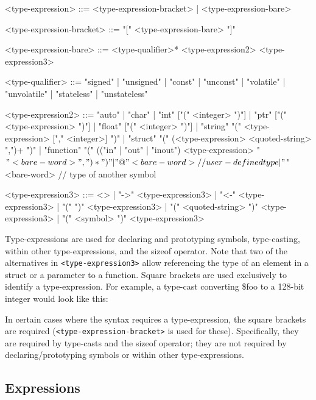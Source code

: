 \begin{sourcestyle}
\begin{verbatimtab}[\sourcetabsize]
<type-expression> ::= <type-expression-bracket>
| <type-expression-bare>

<type-expression-bracket> ::= "[" <type-expression-bare> "]"

<type-expression-bare> ::= <type-qualifier>*
  <type-expression2> <type-expression3>

<type-qualifier> ::= "signed"
| "unsigned"
| "const"
| "unconst"
| "volatile"
| "unvolatile"
| "stateless"
| "unstateless"

<type-expression2> ::= "auto"
| "char"
| "int" ["(" <integer> ")"]
| "ptr" ["(" <type-expression> ")"]
| "float" ["(" <integer> ")"]
| "string" "(" <type-expression> ["," <integer>] ")"
| "struct" "(" (<type-expression> <quoted-string> ",")+ ")"
| "function" "(" (("in" | "out" | "inout") <type-expression>
  "$" <bare-word> ",")* ")"
| "@" <bare-word>  // user-defined type
| "$" <bare-word>  // type of another symbol

<type-expression3> ::= <>
| "->" <type-expression3>
| "<-" <type-expression3>
| "(" ")" <type-expression3>
| "(" <quoted-string> ")" <type-expression3>
| "(" <symbol> ")" <type-expression3>
\end{verbatimtab}
\end{sourcestyle}

Type-expressions are used for declaring and prototyping symbols, type-casting, within other type-expressions, and the
sizeof operator.  Note that two of the alternatives in \verb_<type-expression3>_ allow referencing the type of an
element in a struct or a parameter to a function.  Square brackets are used exclusively to identify a type-expression.
For example, a type-cast converting \$foo to a 128-bit integer would look like this:

\begin{sourcestyle}
\end{sourcestyle}

In certain cases where the syntax requires a type-expression, the square brackets are required
(\verb_<type-expression-bracket>_ is used for these).  Specifically, they are required by type-casts and the sizeof
operator; they are not required by declaring/prototyping symbols or within other type-expressions.

\subsection{Expressions}

